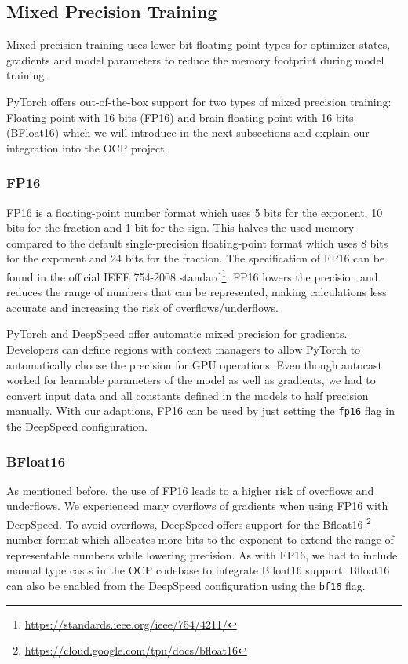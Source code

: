 \subsection{Mixed Precision Training}
\label{subsection:mixedprecision}

Mixed precision training uses lower bit floating point types for optimizer states, gradients and model parameters to 
reduce the memory footprint during model training. 

PyTorch offers out-of-the-box support for two types of mixed precision training: Floating point with 16 bits (FP16) and 
brain floating point with 16 bits (BFloat16) which we will introduce in the next subsections and explain our integration 
into the OCP project.

\subsubsection{FP16}

FP16 is a floating-point number format which uses 5 bits for the exponent, 10 bits for the fraction and 1 bit for the 
sign. This halves the used memory compared to the default single-precision floating-point format which uses 8 bits 
for the exponent and 24 bits for the fraction. The specification of FP16 can be found in the official IEEE 754-2008 
standard\footnote{\url{https://standards.ieee.org/ieee/754/4211/}}.
FP16 lowers the precision and reduces the range of numbers that can be represented, making calculations less 
accurate and increasing the risk of overflows/underflows.

PyTorch and DeepSpeed offer automatic mixed precision for gradients. Developers can define regions with context managers 
to allow PyTorch to automatically choose the precision for GPU operations. Even though autocast worked for learnable
parameters of the model as well as gradients, we had to convert input data and all constants defined in the models to half
precision manually. With our adaptions, 
FP16 can be used by just setting the \texttt{fp16} flag in the DeepSpeed configuration.

\subsubsection{BFloat16}

As mentioned before, the use of FP16 leads to a higher risk of overflows and underflows. We experienced many overflows 
of gradients when using FP16 with DeepSpeed. To avoid overflows, DeepSpeed offers support for the Bfloat16
\footnote{\url{https://cloud.google.com/tpu/docs/bfloat16}}
number format which allocates more bits to the exponent to extend the range of representable numbers while lowering 
precision.
As with FP16, we had to include manual type casts in the OCP codebase to integrate Bfloat16 support. 
Bfloat16 can also be enabled from the DeepSpeed configuration using the \texttt{bf16} flag.



